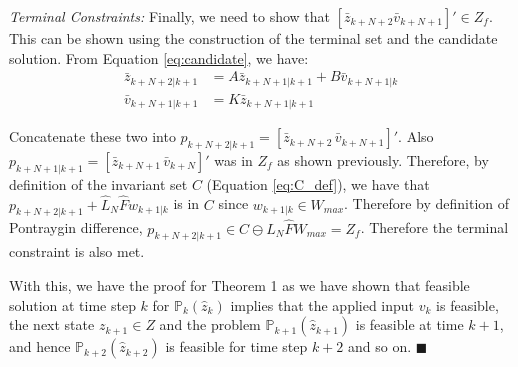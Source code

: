 \textit{Terminal Constraints:} Finally, we need to show that $[\bar{z}_{k+N+2} \bar{v}_{k+N+1}]' \in Z_f$. This can be shown using the construction of the terminal set and the candidate solution. From Equation \ref{eq:candidate}, we have:
\begin{subequations}
\begin{align}
\bar{z}_{k+N+2|k+1}&=A\bar{z}_{k+N+1|k+1} + B\bar{v}_{k+N+1|k} \\
\bar{v}_{k+N+1|k+1}&=K\bar{z}_{k+N+1|k+1}
\end{align}
\end{subequations}

Concatenate these two into $p_{k+N+2|k+1} = [\bar{z}_{k+N+2}\, \bar{v}_{k+N+1}]'$. Also $p_{k+N+1|k+1} = [\bar{z}_{k+N+1} \,\bar{v}_{k+N}]'$ was in $Z_f$ as shown previously. Therefore, by definition of the invariant set $C$ (Equation \ref{eq:C_def}), we have that $p_{k+N+2|k+1} + \hat{L}_N \hat{F} w_{k+1|k}$ is in $C$ since $w_{k+1|k}\in W_{max}$. Therefore by definition of Pontraygin difference, $p_{k+N+2|k+1} \in C \ominus \hat{L}_N\hat{F}W_{max} = Z_f$. Therefore the terminal constraint is also met.

With this, we have the proof for Theorem 1 as we have shown that feasible solution at time step $k$ for $\mathbb{P}_{k}(\hat{z}_{k}) $ implies that the applied input $v_k$ is feasible, the next state $z_{k+1} \in Z$ and the problem $\mathbb{P}_{k+1}(\hat{z}_{k+1}) $ is feasible at time $k+1$, and hence  $\mathbb{P}_{k+2}(\hat{z}_{k+2}) $ is feasible for time step $k+2$ and so on. $\blacksquare$






